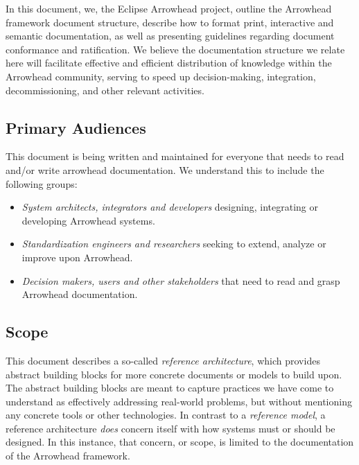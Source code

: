 %
%

In this document, we, the Eclipse Arrowhead project, outline the Arrowhead framework document structure, describe how to format print, interactive and semantic documentation, as well as presenting guidelines regarding document conformance and ratification.
We believe the documentation structure we relate here will facilitate effective and efficient distribution of knowledge within the Arrowhead community, serving to speed up decision-making, integration, decommissioning, and other relevant activities.

\subsection{Primary Audiences}
\label{sec:introduction:audiences}

This document is being written and maintained for everyone that needs to read and/or write arrowhead documentation.
We understand this to include the following groups:

\begin{itemize}
\item \textit{System architects, integrators and developers} designing, integrating or developing Arrowhead systems.
\item \textit{Standardization engineers and researchers} seeking to extend, analyze or improve upon Arrowhead.
\item \textit{Decision makers, users and other stakeholders} that need to read and grasp Arrowhead documentation.
\end{itemize}

\subsection{Scope}
\label{sec:introduction:scope}

This document describes a so-called \textit{reference architecture}, which provides abstract building blocks for more concrete documents or models to build upon.
The abstract building blocks are meant to capture practices we have come to understand as effectively addressing real-world problems, but without mentioning any concrete tools or other technologies.
In contrast to a \textit{reference model}, a reference architecture \textit{does} concern itself with how systems must or should be designed.
In this instance, that concern, or scope, is limited to the documentation of the Arrowhead framework.

